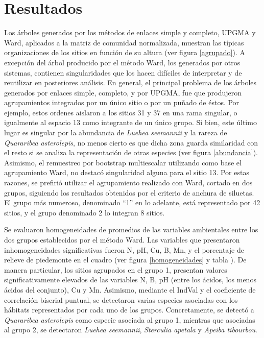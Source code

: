 \documentclass[11pt,]{article}
\begin{document}
\section{Resultados}\label{resultados}

Los árboles generados por los métodos de enlaces simple y completo,
UPGMA y Ward, aplicados a la matriz de comunidad normalizada, muestran
las típicas organizaciones de los sitios en función de su altura (ver
figura \ref{agrupado}). A excepción del árbol producido por el método
Ward, los generados por otros sistemas, contienen singularidades que los
hacen difíciles de interpretar y de reutilizar en posteriores análisis.
En general, el principal problema de los árboles generados por enlaces
simple, completo, y por UPGMA, fue que produjeron agrupamientos
integrados por un único sitio o por un puñado de éstos. Por ejemplo,
estos ordenes aislaron a los sitios 31 y 37 en una rama singular, o
igualmente al espacio 13 como integrante de un único grupo. Si bien,
este último lugar es singular por la abundancia de \emph{Luehea
seemannii} y la rareza de \emph{Quararibea asterolepis}, no menos cierto
es que dicha zona guarda similaridad con el resto si se analiza la
representación de otras especies (ver figura \ref{abundancia}).
Asimismo, el remuestreo por bootstrap multiescalar utilizando como base
el agrupamiento Ward, no destacó singularidad alguna para el sitio 13.
Por estas razones, se prefirió utilizar el agrupamiento realizado con
Ward, cortado en dos grupos, siguiendo los resultados obtenidos por el
criterio de anchura de siluetas. El grupo más numeroso, denominado ``1''
en lo adelante, está representado por 42 sitios, y el grupo denominado 2
lo integran 8 sitios.

Se evaluaron homogeneidades de promedios de las variables ambientales
entre los dos grupos establecidos por el método Ward. Las variables que
presentaron inhomogeneidades significativas fueron N, pH, Cu, B, Mn, y
el porcentaje de relieve de piedemonte en el cuadro (ver figura
\ref{homogeneidades} y tabla \label{promedio}). De manera particular,
los sitios agrupados en el grupo 1, presentan valores significativamente
elevados de las variables N, B, pH (entre los ácidos, los menos ácidos
del conjunto), Cu y Mn. Asimismo, mediante el IndVal y el coeficiente de
correlación biserial puntual, se detectaron varias especies asociadas
con los hábitats representados por cada uno de los grupos.
Concretamente, se detectó a \emph{Quararibea asterolepis} como especie
asociada al grupo 1, mientras que asociadas al grupo 2, se detectaron
\emph{Luehea seemannii}, \emph{Sterculia apetala} y \emph{Apeiba
tibourbou}.
\end{document}
